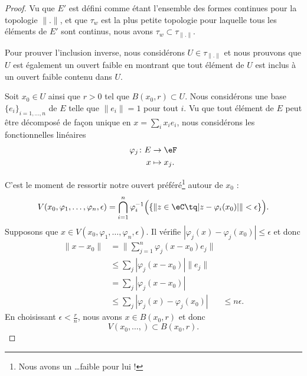 \begin{proof}
	Vu que \( E'\) est défini comme étant l'ensemble des formes continues pour la topologie \( \| . \|\), et que \( \tau_w\) est la plus petite topologie pour laquelle tous les éléments de \( E'\) sont continus, nous avons \( \tau_w\subset\tau_{\| . \|}\).

	Pour prouver l'inclusion inverse, nous considérons \( U\in\tau_{\| . \|}\) et nous prouvons que \( U\) est également un ouvert faible en montrant que tout élément de $U$ est inclus à un ouvert faible contenu dans \( U\).


	Soit \( x_0\in U\) ainsi que \( r>0\) tel que \( B(x_0,r)\subset U\). Nous considérons une base \( \{ e_i \}_{i=1,\ldots, n}\) de \( E\) telle que \( \| e_i \|=1\) pour tout \( i\). Vu que tout élément de \( E\) peut être décomposé de façon unique en \( x=\sum_ix_ie_i\), nous considérons les fonctionnelles linéaires
	\begin{equation}
		\begin{aligned}
			\varphi_j\colon E & \to \eF      \\
			x                 & \mapsto x_j.
		\end{aligned}
	\end{equation}

	C'est le moment de ressortir notre ouvert préféré\footnote{Nous avons un \ldots faible pour lui !} autour de \( x_0\) :
	\begin{equation}
		V(x_0,\varphi_1,\ldots, \varphi_n,\epsilon)=\bigcap_{i=1}^n\varphi_i^{-1}\Big( \{  \| z\in \eC\tq | z-\varphi_i(x_0) | \|<\epsilon  \} \Big).
	\end{equation}
	Supposons que \( x\in V(x_0,\varphi_1,\ldots, \varphi_n,\epsilon)\). Il vérifie \( | \varphi_j(x)-\varphi_j(x_0) |\leq \epsilon\) et donc
	\begin{subequations}
		\begin{align}
			\| x-x_0 \| & =\| \sum_{j=1}^n\varphi_j(x-x_0)e_j \|     \\
			            & \leq \sum_j| \varphi_j(x-x_0) |\| e_j \|   \\
			            & = \sum_j| \varphi_j(x-x_0) |               \\
			            & \leq \sum_j| \varphi_j(x)-\varphi_j(x_0) |
			            & \leq n\epsilon.
		\end{align}
	\end{subequations}
	En choisissant \( \epsilon<\frac{ r }{ n }\), nous avons \( x\in B(x_0,r)\) et donc
	\begin{equation}
		V(x_0,\ldots, )\subset B(x_0,r).
	\end{equation}
\end{proof}

